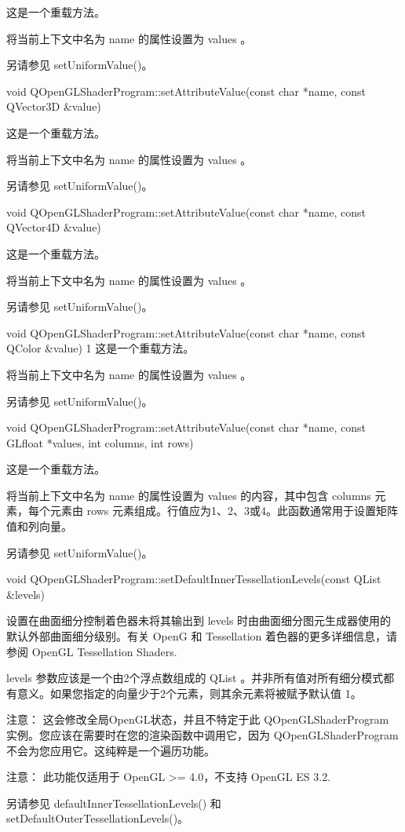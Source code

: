 这是一个重载方法。

将当前上下文中名为 name 的属性设置为 values 。

另请参见 setUniformValue()。

void QOpenGLShaderProgram::setAttributeValue(const char *name, const QVector3D \&value)

这是一个重载方法。

将当前上下文中名为 name 的属性设置为 values 。

另请参见 setUniformValue()。

void QOpenGLShaderProgram::setAttributeValue(const char *name, const QVector4D \&value)

这是一个重载方法。

将当前上下文中名为 name 的属性设置为 values 。

另请参见 setUniformValue()。

void QOpenGLShaderProgram::setAttributeValue(const char *name, const QColor \&value)
1
这是一个重载方法。

将当前上下文中名为 name 的属性设置为 values 。

另请参见 setUniformValue()。

void QOpenGLShaderProgram::setAttributeValue(const char *name, const GLfloat *values, int columns, int rows)

这是一个重载方法。

将当前上下文中名为 name 的属性设置为 values 的内容，其中包含 columns 元素，每个元素由 rows 元素组成。行值应为1、2、3或4。此函数通常用于设置矩阵值和列向量。

另请参见 setUniformValue()。

void QOpenGLShaderProgram::setDefaultInnerTessellationLevels(const QList \&levels)

设置在曲面细分控制着色器未将其输出到 levels 时由曲面细分图元生成器使用的默认外部曲面细分级别。有关 OpenG 和 Tessellation 着色器的更多详细信息，请参阅 OpenGL Tessellation Shaders.

levels 参数应该是一个由2个浮点数组成的 QList 。并非所有值对所有细分模式都有意义。如果您指定的向量少于2个元素，则其余元素将被赋予默认值 1。

注意： 这会修改全局OpenGL状态，并且不特定于此 QOpenGLShaderProgram 实例。您应该在需要时在您的渲染函数中调用它，因为 QOpenGLShaderProgram 不会为您应用它。这纯粹是一个遍历功能。

注意： 此功能仅适用于 OpenGL >= 4.0，不支持 OpenGL ES 3.2.

另请参见 defaultInnerTessellationLevels() 和 setDefaultOuterTessellationLevels()。

